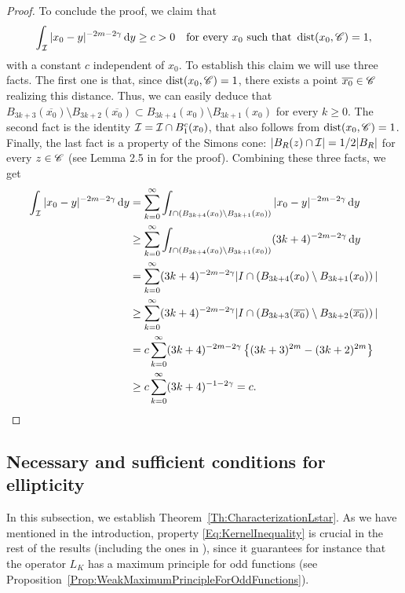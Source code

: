 \begin{proof}
	To conclude the proof, we claim that
	$$ \int_{\mathcal{I}} |x_0-y|^{-2m-2\gamma} \,\mathrm{d} y \geq c>0\quad \textrm{for every } x_0 \textrm{ such that } \operatorname{dist}(x_0,\mathscr{C}) = 1,$$
	with a constant $c$ independent of $x_0$. To establish this claim we will use three facts. The first one is that, since $\operatorname{dist}(x_0,\mathscr{C}) = 1$, there exists a point $\overline{x_0}\in \mathscr{C}$ realizing this distance. Thus, we can easily deduce that $B_{3k+3}(\overline{x_0}) \setminus B_{3k+2}(\overline{x_0}) \subset  B_{3k+4}(x_0)\setminus B_{3k+1}(x_0)$ for every $k\geq 0$. The second fact is the identity $\mathcal{I} = \mathcal{I} \cap B_1^c(x_0)$, that also follows from $\operatorname{dist}(x_0,\mathscr{C}) = 1$. Finally, the last fact is a property of the Simons cone: $|B_R(z) \cap \mathcal{I}| = 1/2 |B_R|$ for every $z\in \mathscr{C}$ (see Lemma 2.5 in \cite{Felipe-Sanz-Perela:SaddleFractional} for the proof). Combining these three facts, we get
	\begin{align*}
	\int_{\mathcal{I}} |x_0-y|^{-2m-2\gamma} \,\mathrm{d} y &= \sum_{k=0}^\infty \int_{I\cap \left( B_{3k+4}(x_0)\setminus B_{3k+1}(x_0)\right)} |x_0-y|^{-2m-2\gamma} \,\mathrm{d} y\\
	&\geq \sum_{k=0}^\infty \int_{I\cap \left( B_{3k+4}(x_0)\setminus B_{3k+1}(x_0)\right)} (3k+4)^{-2m-2\gamma} \,\mathrm{d} y \\
	&= \sum_{k=0}^\infty (3k+4)^{-2m-2\gamma} |I\cap \left( B_{3k+4}(x_0)\setminus B_{3k+1}(x_0)\right)|\\
	&\geq \sum_{k=0}^\infty (3k+4)^{-2m-2\gamma} |I\cap \left( B_{3k+3}(\overline{x_0}) \setminus B_{3k+2}(\overline{x_0}) \right)|\\
	&= c \sum_{k=0}^\infty (3k+4)^{-2m-2\gamma} \left\{(3k+3)^{2m} -(3k+2)^{2m}\right\}\\
	&\geq c \sum_{k=0}^\infty (3k+4)^{-1-2\gamma} = c.
	\end{align*}
\end{proof}


\subsection{Necessary and sufficient conditions for ellipticity}




In this subsection, we establish Theorem~\ref{Th:CharacterizationLstar}. As we have mentioned in the introduction, property \eqref{Eq:KernelInequality} is crucial in the rest of the results (including the ones in \cite{FelipeSanz-Perela:IntegroDifferentialII}), since it guarantees for instance that the operator $L_K$ has a maximum principle for odd functions (see Proposition~\ref{Prop:WeakMaximumPrincipleForOddFunctions}).

